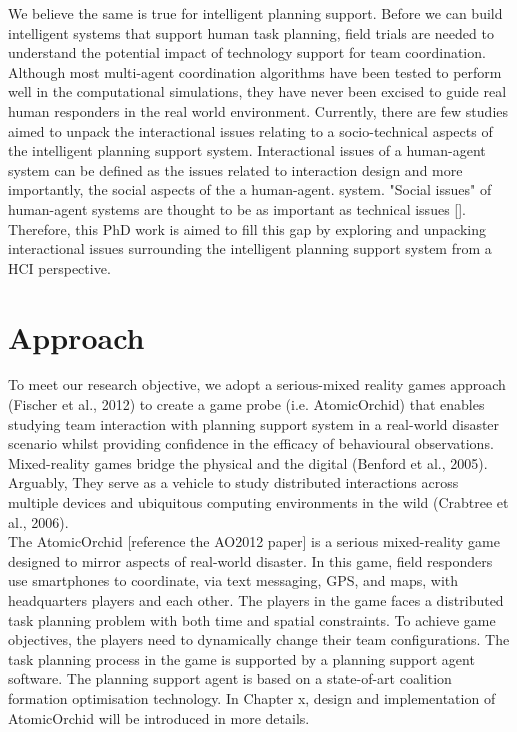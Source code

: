 We believe the same is true for intelligent planning support. Before we can build intelligent systems that support human task planning, field trials are needed to understand the potential impact of technology support for team coordination. Although most multi-agent coordination algorithms have been tested to perform well in the computational simulations, they have never been excised to guide real human responders in the real world environment. Currently, there are few studies aimed to unpack the interactional issues relating to a socio-technical aspects of the intelligent planning support system. Interactional issues of a human-agent system can be defined as the issues related to interaction design and more importantly, the social aspects of the a human-agent. system. "Social issues" of human-agent systems are thought to be as important as technical issues []. Therefore, this PhD work is aimed to fill this gap by exploring and unpacking interactional issues surrounding the intelligent planning support system from a HCI perspective.\\

\section{Approach}\label{sec:custom}

To meet our research objective, we adopt a serious-mixed reality games approach (Fischer et al., 2012) to create a game probe (i.e. AtomicOrchid) that enables studying team interaction with planning support system in a real-world disaster scenario whilst providing confidence in the efficacy of behavioural observations. Mixed-reality games bridge the physical and the digital (Benford et al., 2005). Arguably, They serve as a vehicle to study distributed interactions across multiple devices and ubiquitous computing environments in the wild (Crabtree et al., 2006).\\

The AtomicOrchid [reference the AO2012 paper] is a serious mixed-reality game designed to mirror aspects of real-world disaster. In this game, field responders use smartphones to coordinate, via text messaging, GPS, and maps, with headquarters players and each other. The players in the game faces a distributed task planning problem with both time and spatial constraints. To achieve game objectives, the players need to dynamically change their team configurations. The task planning process in the game is supported by a planning support agent software. The planning support agent is based on a state-of-art coalition formation optimisation technology.  In Chapter x, design and implementation of AtomicOrchid will be introduced in more details.\\

